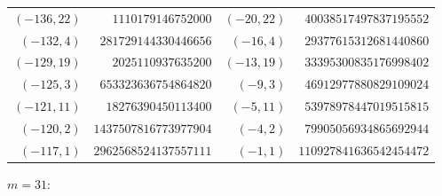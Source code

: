 \documentclass[11pt]{amsart}
\theoremstyle{definition}
\begin{document}
{\begin{tabular}{@{}r@{\ \ }r@{\qquad}r@{\ \ }r@{}}
$(-136,22)$ & $1110179146752000$ & $(-20,22)$ & $40038517497837195552$ \\
$(-132,4)$ & $281729144330446656$ & $(-16,4)$ & $29377615312681440860$ \\
$(-129,19)$ & $2025110937635200$ & $(-13,19)$ & $33395300835176998402$ \\
$(-125,3)$ & $653323636754864820$ & $(-9,3)$ & $46912977880829109024$ \\
$(-121,11)$ & $18276390450113400$ & $(-5,11)$ & $53978978447019515815$ \\
$(-120,2)$ & $1437507816773977904$ & $(-4,2)$ & $79905056934865692944$ \\
$(-117,1)$ & $2962568524137557111$ & $(-1,1)$ & $110927841636542454472$ \\
\end{tabular}}\par\medskip
\noindent$m=31$:\nopagebreak\\[2pt]
\end{document}
